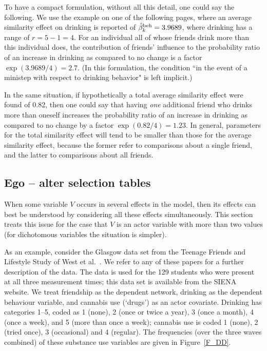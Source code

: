 \documentclass[a4paper,fleqn,11pt]{article}
\newcommand{\+}{\, + \,}
\newcommand{\SI}{{\sf SIENA }}
\begin{document}
To have a compact formulation, without all this detail, one could
say the following. We use the example on one of the following
pages, where an average similarity effect on drinking is reported of
$\hat\beta^{\rm beh}_k = 3.9689$, where drinking has a range of $r = 5-1 = 4$.
For an individual all of whose friends drink more than this individual does,
the contribution of friends' influence to the probability ratio of an increase in drinking
as compared to no change is a factor $\exp(3.9689/4) = 2.7$.
(In this formulation, the condition ``in the event of a ministep
with respect to drinking behavior" is left implicit.)

In the same situation, if hypothetically a total average similarity
effect were found of 0.82, then one could say that having \emph{one} additional
friend who drinks more than oneself increases the probability ratio of an increase in drinking
as compared to no change by a factor $\exp(0.82/4) = 1.23$.
In general, parameters for the total similarity effect will tend to be
smaller than those for the average similarity effect, because the former
refer to comparisons about a single friend, and the latter to comparisons
about all friends.

\subsection{Ego -- alter selection tables}

When some variable $V$ occurs in several effects in the model,
then its effects can best be understood
by considering all these effects simultaneously.
This section treats this issue for the case that $V$ is an
actor variable with more than two values (for dichotomous
variables the situation is simpler).

As an example, consider the
Glasgow data set from the Teenage Friends and Lifestyle Study of
West et al.\ \citep{MichellWest1996,PearsonWest03,SteglichEA10}.
We refer to any of these papers for a further description of the data.
The data is used for the 129 students who were present at all three measurement
times; this data set is available from the \SI website.
We treat friendship as the dependent network, drinking as the
dependent behaviour variable, and cannabis use (`drugs') as an
actor covariate.
Drinking has categories 1--5, coded as
1 (none), 2 (once or twice a year), 3 (once a month), 4 (once a week),
and 5 (more than once a week);
cannabis use is coded 1 (none), 2 (tried once), 3 (occasional) and 4 (regular).
The frequencies (over the three waves combined) of these substance
use variables are given in Figure~\ref{F_DD}.
\end{document}
